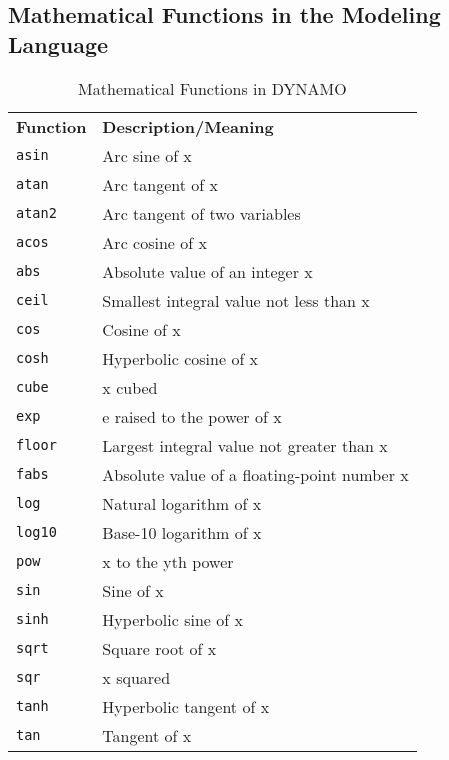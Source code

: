\newpage
\subsection{Mathematical Functions in the Modeling Language}
\label{Mathematical Functions in the System Description Language}

\begin{table}[htdp]
\caption{Mathematical Functions in DYNAMO}
\begin{center}
\vspace{.5cm}
\begin{tabular}{ll}
 \textbf{Function} & \textbf{Description/Meaning}\\

     \texttt{asin}      & Arc sine of x \\
     \texttt{atan}      & Arc tangent of x\\
     \texttt{atan2}     & Arc tangent of two variables\\
     \texttt{acos}      & Arc cosine of x\\
     \texttt{abs}       & Absolute value of an integer x\\
     \texttt{ceil}      & Smallest integral value not less than x\\
     \texttt{cos}       & Cosine of x\\
     \texttt{cosh}      & Hyperbolic cosine of x\\
     \texttt{cube}      & x cubed\\
     \texttt{exp}       & e raised to the power of x\\
     \texttt{floor}     & Largest integral value not greater than x\\
     \texttt{fabs}      & Absolute value of a floating-point number x\\
     \texttt{log}       & Natural logarithm of x\\
     \texttt{log10}     & Base-10 logarithm of x\\
     \texttt{pow}       & x to the yth power\\
     \texttt{sin}       & Sine of x\\
     \texttt{sinh}      & Hyperbolic sine of x\\
     \texttt{sqrt}      & Square root of x\\
     \texttt{sqr}       & x squared\\
     \texttt{tanh}      & Hyperbolic tangent of x\\
     \texttt{tan}       & Tangent of x\\

\end{tabular}
\end{center}
\label{default}
\end{table}%

